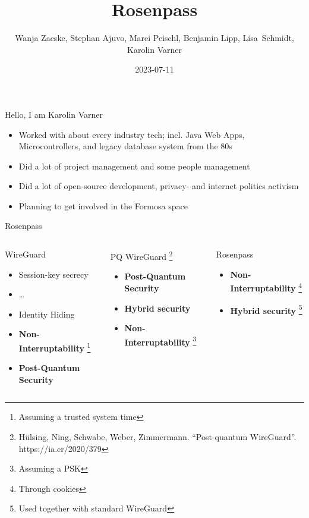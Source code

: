 \documentclass{rosenpass-beamer}
\title{Rosenpass}
\author{
Wanja Zaeske, Stephan Ajuvo, Marei Peischl, Benjamin Lipp, Lisa~Schmidt, Karolin Varner
}
\institute{\url{https://rosenpass.eu}}
\date{2023-07-11}
\newcommand*\itemtick{\item[\Checkmark]}
\newcommand*\itemfail{\item[\XSolidBrush]}
\newcommand*{\heading}[1]{
  {
    \hspace*{-0.5cm}#1
    \vspace{1.0em}
  }
}
\begin{document}
\maketitle

\begin{frame}{Hello, I am Karolin Varner}
\begin{itemize}
  \item Worked with about every industry tech; incl. Java Web Apps, Microcontrollers, and legacy database system from the 80s
  \item Did a lot of project management and some people management
  \item Did a lot of open-source development, privacy- and internet politics activism
  \item Planning to get involved in the Formosa space
\end{itemize}
\end{frame}

\begin{frame}{Rosenpass}

\vspace{0.5em}
\begin{columns}[t]
\begin{column}{.30\textwidth}
\heading{WireGuard}
\begin{itemize}
  \itemtick Session-key secrecy
  \itemtick \dots
  \itemtick Identity Hiding
  \itemfail \textbf{Non-Interruptability} \footnote[frame]{Assuming a trusted system time}
  \itemfail \textbf{Post-Quantum Security}
\end{itemize}
\end{column}

\begin{column}{.30\textwidth}
\heading{
  PQ WireGuard
  \footnote[frame]{
	  Hülsing, Ning, Schwabe, Weber, Zimmermann. “Post-quantum WireGuard”. https://ia.cr/2020/379
	}
}
\begin{itemize}
  \itemtick \textbf{Post-Quantum Security}
  \itemfail \textbf{Hybrid security}
  \itemfail \textbf{Non-Interruptability} \footnote[frame]{Assuming a PSK}
\end{itemize}
\end{column}

\begin{column}{.30\textwidth}
\heading{Rosenpass}
\begin{itemize}
  \itemtick \textbf{Non-Interruptability} \footnote[frame]{Through cookies}
  \itemtick \textbf{Hybrid security} \footnote[frame]{Used together with standard WireGuard}
\end{itemize}
\end{column}

\end{columns}
\vspace{1.5em}

\end{frame}
\end{document}
